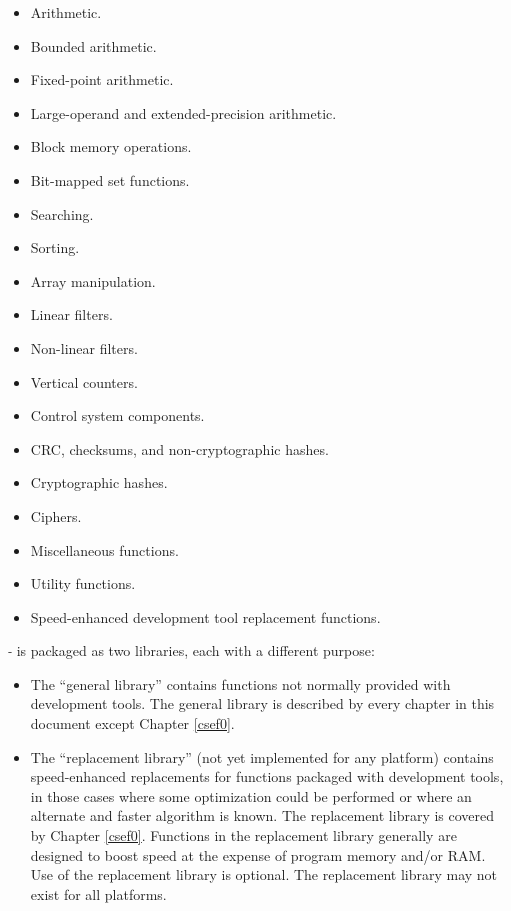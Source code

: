 \begin{itemize}
\item Arithmetic.
\item Bounded arithmetic.
\item Fixed-point arithmetic.
\item Large-operand and extended-precision arithmetic.
\item Block memory operations.
\item Bit-mapped set functions.
\item Searching.
\item Sorting.
\item Array manipulation.
\item Linear filters.
\item Non-linear filters.
\item Vertical counters.
\item Control system components.
\item CRC, checksums, and non-cryptographic hashes.
\item Cryptographic hashes.
\item Ciphers.
\item Miscellaneous functions.
\item Utility functions.
\item Speed-enhanced development tool replacement functions.
\end{itemize}

\emph{\productbasenameshort{}-\productversion{}}
is packaged as two libraries, each with
a different purpose:

\begin{itemize}
\item The ``general library'' contains functions not normally provided
      with development tools.  The general library is described by
      every chapter in this document except Chapter \ref{csef0}.
\item The ``replacement library'' (not yet implemented
      for any platform) contains
      speed-enhanced replacements
      for functions packaged with development tools, in those cases
      where some optimization could be performed or where an alternate
      and faster algorithm is known.  The replacement library is covered by 
      Chapter \ref{csef0}.  Functions in the replacement library
      generally are designed to boost speed at the expense of program
      memory and/or RAM\@.  Use of the replacement library is optional.  
      The replacement library may not exist for all platforms.
\end{itemize}


